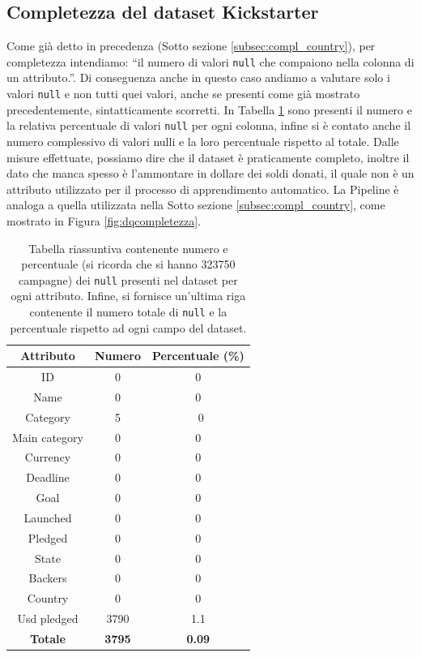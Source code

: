 \subsection{Completezza del dataset Kickstarter}
Come già detto in precedenza (Sotto sezione \ref{subsec:compl_country}), per completezza intendiamo: “il numero di valori  \texttt{null} che compaiono nella colonna di un attributo.”.
Di conseguenza anche in questo caso andiamo a valutare solo i valori \texttt{null} e non tutti quei valori, anche se presenti come già mostrato precedentemente, sintatticamente scorretti.
In Tabella \ref{tab:compl_ks} sono presenti il numero e la relativa percentuale di valori \texttt{null} per ogni colonna, infine si è contato anche il numero complessivo di valori nulli e la loro percentuale rispetto al totale.
Dalle misure effettuate, possiamo dire che il dataset è praticamente completo, inoltre il dato che manca spesso è l'ammontare in dollare dei soldi donati, il quale non è un attributo utilizzato per il processo di apprendimento automatico.
La Pipeline è analoga a quella utilizzata nella Sotto sezione \ref{subsec:compl_country}, come mostrato in Figura \ref{fig:dqcompletezza}.
\begin{table}
	\caption{Tabella riassuntiva contenente numero e percentuale (si ricorda che si hanno 323750 campagne) dei \texttt{null} presenti nel dataset per ogni attributo. Infine, si fornisce un'ultima riga contenente il numero totale di \texttt{null} e la percentuale rispetto ad ogni campo del dataset.}
	
	\label{tab:compl_ks}
	
	\centering
	\begin{tabular}{|c|c|c|}
		\hline
		\textbf{Attributo}  & \textbf{Numero} & \textbf{Percentuale (\%)} \\ 
		\hline  
		\rule{0pt}{13pt}ID & 0 & 0 \\ 
		\hline  
		\rule{0pt}{13pt}Name & 0  & 0 \\ 
		\hline  
		\rule{0pt}{13pt}Category & 5 & ~0 \\ 
		\hline  
		\rule{0pt}{13pt}Main category & 0 & 0 \\ 
		\hline
		\rule{0pt}{13pt}Currency & 0 & 0 \\
		\hline
		\rule{0pt}{13pt}Deadline & 0 & 0 \\
		\hline
		\rule{0pt}{13pt}Goal & 0 & 0 \\
		\hline
		\rule{0pt}{13pt}Launched & 0 & 0 \\
		\hline
		\rule{0pt}{13pt}Pledged & 0 & 0 \\
		\hline
		\rule{0pt}{13pt}State & 0 & 0 \\
		\hline
		\rule{0pt}{13pt}Backers & 0 & 0\\
		\hline
		\rule{0pt}{13pt}Country & 0 & 0 \\
		\hline
		\rule{0pt}{13pt}Usd pledged & 3790 & 1.1 \\
		\hline
		\rule{0pt}{13pt}\textbf{Totale} & \textbf{3795} & \textbf{0.09} \\
		\hline
	\end{tabular}
\end{table}


